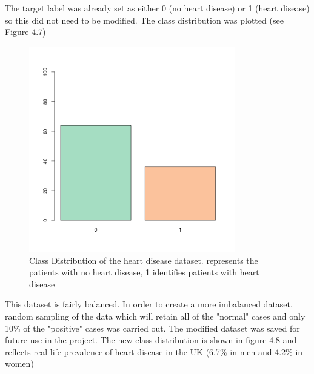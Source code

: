 The target label was already set as either 0 (no heart disease) or 1 (heart disease) so this did not need to be modified. 
The class distribution was plotted (see Figure 4.7)

\begin{figure}[H]
    \centering
    \includegraphics[width=0.8\textwidth]{ThesisTemplate/usingLatex/chapter4Images/figure4_16.png}
    \caption{Class Distribution of the heart disease dataset. represents the patients with no heart disease, 1 identifies patients with heart disease}
    \label{fig:my_label}
\end{figure}

This dataset is fairly balanced. In order to create a more imbalanced dataset, random sampling of the data which will retain all of the "normal" cases and only 10\% of the "positive" cases was carried out. The modified dataset was saved for future use in the project. The new class distribution is shown in figure 4.8 and reflects real-life prevalence of heart disease in the UK (6.7\% in men and 4.2\% in women)


